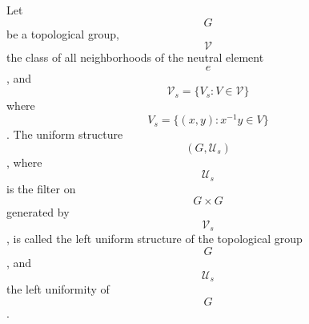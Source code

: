 Let $$G$$ be a topological group, $$\mathcal{V}$$ the class of all neighborhoods of the neutral element $$e$$, and $$\mathcal{V}_s = \{V_s : V \in \mathcal{V}\}$$ where $$V_s = \{(x, y) : x^{-1}y \in V\}$$. The uniform structure $$(G, \mathcal{U}_s)$$, where $$\mathcal{U}_s$$ is the filter on $$G \times G$$ generated by $$\mathcal{V}_s$$, is called the left uniform structure of the topological group $$G$$, and $$\mathcal{U}_s$$ the left uniformity of $$G$$.
